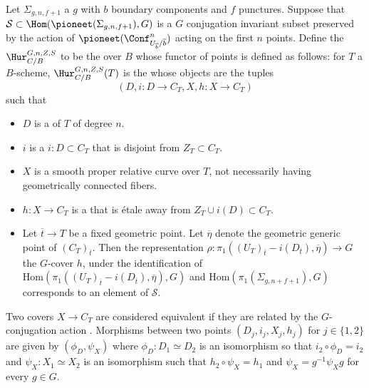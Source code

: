 \begin{definition}
    Let $\Sigma_{g,n,f+1}$ a  $g$  with $b$ boundary components and $f$ punctures.
    Suppose that $\mathcal{S} \subset \Hom(\pioneet(\Sigma_{g,n,f+1}),G)$ is a $G$ conjugation invariant subset preserved by the action of $\pioneet(\Conf_{U_{\overline{b}} / \overline{b}}^n)$ acting on the first $n$ points. Define the  $\Hur_{C/B}^{G,n,Z,S}$ to be the  over $B$ whose functor of points is defined as follows: for $T$ a $B$-scheme, $\Hur_{C/B}^{G,n,Z,S}(T)$ is the  whose objects are the tuples
    $$(D,i: D \to C_T, X, h: X \to C_T)$$
    such that 
    \begin{itemize}
        \item $D$ is a  of $T$ of degree $n$.
        \item $i$ is a  $i: D \subset C_T$ that is disjoint from $Z_T \subset C_T$.
        \item $X$ is a smooth proper relative curve over $T$, not necessarily having geometrically connected fibers.
        \item $h: X \to C_T$ is a   that is \'etale away from $Z_T \cup i(D) \subset C_T$. 
        \item Let ${\overline{t}} \to T$ be a fixed geometric point. Let $\overline{\eta}$ denote the geometric generic point of $(C_T)_{\overline{t}}$. Then the representation $\rho: \pi_1((U_T)_{\overline{t}}-i(D_{\overline{t}}), \overline{\eta}) \to G$  the $G$-cover $h$, under the identification of $\mathrm{Hom}(\pi_1((U_T)_{\overline{t}}-i(D_{\overline{t}}), \overline{\eta}),G)$ and $\mathrm{Hom}(\pi_1(\Sigma_{g,n+f+1}), G)$ corresponds to an element of $\mathcal S$.
    \end{itemize}
    Two covers $X \to C_T$ are considered equivalent if they are related by the $G$-conjugation action . Morphisms between two points $(D_j, i_j, X_j, h_j)$ for $j \in \{1,2\}$ are given by $(\phi_D, \psi_X)$ where $\phi_D: D_1 \simeq D_2$ is an isomorphism so that $i_2 \circ \phi_D = i_2$ and $\psi_X: X_1 \simeq X_2$ is an isomorphism such that $h_2 \circ \psi_X = h_1$ and $\psi_X = g^{-1} \psi_X g$ for every $g \in G$.
\end{definition}

